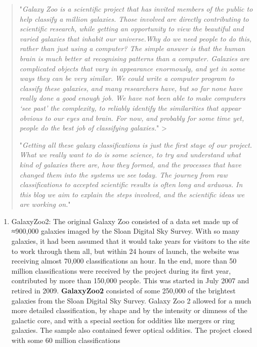 \documentclass[11pt]{article}
\providecommand{\tightlist}{%
      \setlength{\itemsep}{0pt}\setlength{\parskip}{0pt}}
\begin{document}
\begin{quote}
"\emph{Galaxy Zoo is a scientific project that has invited members of
the public to help classify a million galaxies. Those involved are
directly contributing to scientific research, while getting an
opportunity to view the beautiful and varied galaxies that inhabit our
universe.Why do we need people to do this, rather than just using a
computer? The simple answer is that the human brain is much better at
recognising patterns than a computer. Galaxies are complicated objects
that vary in appearance enormously, and yet in some ways they can be
very similar. We could write a computer program to classify these
galaxies, and many researchers have, but so far none have really done a
good enough job. We have not been able to make computers `see past' the
complexity, to reliably identify the similarities that appear obvious to
our eyes and brain. For now, and probably for some time yet, people do
the best job of classifying galaxies.}" \textgreater{}

"\emph{Getting all these galaxy classifications is just the first stage
of our project. What we really want to do is some science, to try and
understand what kind of galaxies there are, how they formed, and the
processes that have changed them into the systems we see today. The
journey from raw classifications to accepted scientific results is often
long and arduous. In this blog we aim to explain the steps involved, and
the scientific ideas we are working on.}"
\end{quote}

\begin{enumerate}
\def\labelenumi{\arabic{enumi}.}
\setcounter{enumi}{1}
\tightlist
\item
  GalaxyZoo2: The original Galaxy Zoo consisted of a data set made up of
  ≈900,000 galaxies imaged by the Sloan Digital Sky Survey. With so many
  galaxies, it had been assumed that it would take years for visitors to
  the site to work through them all, but within 24 hours of launch, the
  website was receiving almost 70,000 classifications an hour. In the
  end, more than 50 million classifications were received by the project
  during its first year, contributed by more than 150,000 people. This
  was started in July 2007 and retired in 2009. \textbf{GalaxyZoo2}
  consisted of some 250,000 of the brightest galaxies from the Sloan
  Digital Sky Survey. Galaxy Zoo 2 allowed for a much more detailed
  classification, by shape and by the intensity or dimness of the
  galactic core, and with a special section for oddities like mergers or
  ring galaxies. The sample also contained fewer optical oddities. The
  project closed with some 60 million classifications
\end{enumerate}
\end{document}
